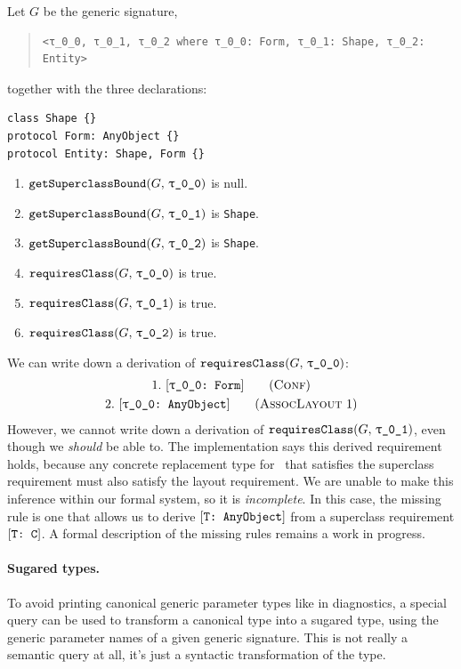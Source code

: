 \documentclass[../generics]{subfiles}
\begin{document}
\begin{example}
Let $G$ be the generic signature,
\begin{quote}
\begin{verbatim}
<τ_0_0, τ_0_1, τ_0_2 where τ_0_0: Form, τ_0_1: Shape, τ_0_2: Entity>
\end{verbatim}
\end{quote}
together with the three declarations:
\begin{Verbatim}
class Shape {}
protocol Form: AnyObject {}
protocol Entity: Shape, Form {}
\end{Verbatim}

\begin{enumerate}
\item $\Query{getSuperclassBound}{G,\,\rT}$ is null.
\item $\Query{getSuperclassBound}{G,\,\rU}$ is \texttt{Shape}.
\item $\Query{getSuperclassBound}{G,\,\rV}$ is \texttt{Shape}.
\item $\Query{requiresClass}{G,\,\rT}$ is true.
\item $\Query{requiresClass}{G,\,\rU}$ is true.
\item $\Query{requiresClass}{G,\,\rV}$ is true.
\end{enumerate}
We can write down a derivation of $\Query{requiresClass}{G,\,\texttt{\rT}}$:
\begin{gather*}
\ConfStep{\rT}{Form}{1}\\
\AssocLayoutStep{1}{\rT}{2}
\end{gather*}
However, we cannot write down a derivation of $\Query{requiresClass}{G,\,\texttt{\rU}}$, even though we \emph{should} be able to. The implementation says this derived requirement holds, because any concrete replacement type for \rU\ that satisfies the superclass requirement must also satisfy the layout requirement. We are unable to make this inference within our formal system, so it is \emph{incomplete}. In this case, the missing rule is one that allows us to derive $[\texttt{T:~AnyObject}]$ from a superclass requirement $[\texttt{T:~C}]$. A formal description of the missing rules remains a work in progress.
\end{example}

\paragraph{Sugared types.} To avoid printing canonical generic parameter types like  in diagnostics, a special query can be used to transform a canonical type into a sugared type, using the generic parameter names of a given generic signature. This is not really a semantic query at all, it's just a syntactic transformation of the type.
\end{document}
